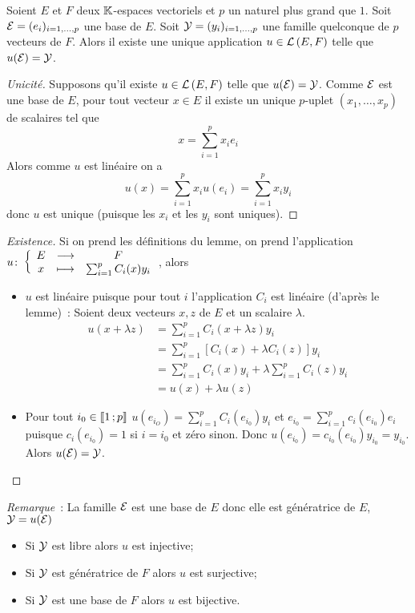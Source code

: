 \begin{theo}\label{theo:caracapplinimagebase}
  Soient \(E\) et \(F\) deux \(\mathbb{K}\)-espaces vectoriels et \(p\) un naturel plus grand que \(1\). Soit \(\mathcal{E}=(e_i)_{i=1, \ldots, p}\) une base de \(E\). Soit \(\mathcal{Y}=(y_i)_{i=1, \ldots, p}\) une famille quelconque de \(p\) vecteurs de \(F\). Alors il existe une unique application \(u \in \mathcal{L}\left(E,F\right)\) telle que \(u(\mathcal{E})=\mathcal{Y}\).
\end{theo}
\begin{proof}[Unicité]
  Supposons qu'il existe \(u \in \mathcal{L}\left(E,F\right)\) telle que \(u(\mathcal{E})=\mathcal{Y}\). Comme \(\mathcal{E}\) est une base de \(E\), pour tout vecteur \(x \in E\) il existe un unique \(p\)-uplet \((x_1, \ldots, x_p)\) de scalaires tel que
  \begin{equation}
    x = \sum_{i=1}^p x_ie_i
  \end{equation}
  Alors comme \(u\) est linéaire on a
  \begin{equation}
    u(x)=\sum_{i=1}^px_i u(e_i) = \sum_{i=1}^px_i y_i
  \end{equation}
  donc \(u\) est unique (puisque les \(x_i\) et les \(y_i\) sont uniques).
\end{proof}
\begin{proof}[Existence]
  Si on prend les définitions du lemme, on prend l'application \(u\colon \left\{\begin{array}{ccc} E & \longrightarrow &F\\ x & \longmapsto & \sum_{i=1}^pC_i(x)y_i \end{array} \right.\), alors
  \begin{itemize}
  \item \(u\) est linéaire puisque pour tout \(i\) l'application \(C_i\) est linéaire (d'après le lemme)~: Soient deux vecteurs \(x,z\) de \(E\) et un scalaire \(\lambda\).
    \begin{align}
      u(x+\lambda z)&=\sum_{i=1}^p C_i(x+\lambda z)y_i \\
      &=\sum_{i=1}^p [C_i(x)+\lambda C_i(z)]y_i \\
      &=\sum_{i=1}^p C_i(x) y_i +\lambda \sum_{i=1}^p C_i(z)y_i\\
      &=u(x)+\lambda u(z)
    \end{align}
  \item Pour tout \(i_0 \in \mathopen{\llbracket}1\mathclose{}\mathpunct{};p\mathclose{\rrbracket}\) \(u(e_{i_O})=\sum_{i=1}^p C_i(e_{i_0}) y_i\) et \(e_{i_0}=\sum_{i=1}^pc_i(e_{i_0}) e_i\) puisque \(c_i(e_{i_0})=1\) si \(i=i_0\) et zéro sinon. Donc \(u(e_{i_0})=c_{i_0}(e_{i_0})y_{i_0}=y_{i_0}\). Alors \(u(\mathcal{E})=\mathcal{Y}\).
  \end{itemize}
\end{proof}

\emph{Remarque}~: La famille \(\mathcal{E}\) est une base de \(E\) donc elle est génératrice de \(E\), \(\mathcal{Y}=u(\mathcal{E})\)
\begin{itemize}
\item Si \(\mathcal{Y}\) est libre alors \(u\) est injective;
\item Si \(\mathcal{Y}\) est génératrice de \(F\) alors \(u\) est surjective;
\item Si \(\mathcal{Y}\) est une base de \(F\) alors \(u\) est bijective.
\end{itemize}

